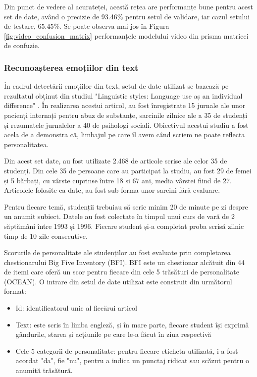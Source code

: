 \documentclass[a4paper, 12pt]{report}
\begin{document}
	Din punct de vedere al acurateței, acestă rețea are performanțe bune pentru acest set de date, având o precizie de 93.46\% pentru setul de validare, iar cazul setului de testare,  65.45\%. Se poate observa mai jos în Figura \ref{fig:video_confusion_matrix} performanțele modelului video din prisma matricei de confuzie.
	
	\clearpage
	\subsubsection{Recunoașterea emoțiilor din text}
	În cadrul detectării emoțiilor din text, setul de date utilizat se bazează pe rezultatul obținut din studiul "Linguistic styles: Language use aș an individual difference" \cite{text_dataset}. În realizarea acestui articol, au fost înregistrate 15 jurnale ale unor pacienți internați pentru abuz de substanțe, sarcinile zilnice ale a 35 de studenți și rezumatele jurnalelor a 40 de psihologi sociali. Obiectivul acestui studiu a fost acela de a demonstra că, limbajul pe care îl avem când scriem ne poate reflecta personalitatea.

	Din acest set date, au fost utilizate 2.468 de articole scrise ale celor 35 de studenți. Din cele 35 de persoane care au participat la studiu, au fost 29 de femei și 5 bărbați, cu vârste cuprinse între 18 și 67 ani, media vârstei fiind de 27. Articolele folosite ca date, au fost sub forma unor sarcini fără evaluare. 

	Pentru fiecare temă, studenții trebuiau să scrie minim 20 de minute pe zi despre un anumit subiect. Datele au fost colectate în timpul unui curs de vară de 2 săptămâni între 1993 și 1996. Fiecare student și-a completat proba scrisă zilnic timp de 10 zile consecutive. 

	Scorurile de personalitate ale studenților au fost evaluate prin completarea chestionarului Big Five Inventory (BFI). BFI este un chestionar alcătuit din 44 de itemi care oferă un scor pentru fiecare din cele 5 trăsături de personalitate (OCEAN). O intrare din setul de date utilizat este construit din următorul format: 
	\begin{itemize}
		\item Id: identificatorul unic al fiecărui articol
		\item Text: este scris în limba engleză, și în mare parte, fiecare student își exprimă gândurile, starea și acțiunile pe care le-a făcut în ziua respectivă
		\item Cele 5 categorii de personalitate: pentru fiecare eticheta utilizată, i-a fost acordat "da", fie "nu", pentru a indica un punctaj ridicat sau scăzut pentru o anumită trăsătură.
	\end{itemize}
\end{document}
